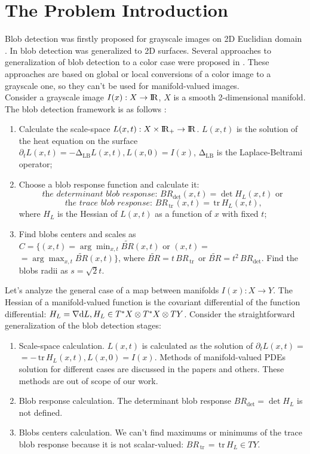 \documentclass{llncs}
\newcommand{\LaplaceBeltrami}{\mathrm{\Delta_{{LB}}}}
\newcommand{\partderiv}[2]{\partial_{#2} {#1}}
\newcommand{\toreal}{\rightarrow\bbbr}
\newcommand{\CovariantDiff}{\nabla}
\newcommand{\Diff}{\mathrm{d}}
\newcommand{\TangentBundle}[1]{T{#1}}
\newcommand{\CotangentBundle}[1]{\tensor*{T}{^{*}}{#1}}
\newcommand {\tr}{{\,}\mathrm{tr}{\,}}
\begin{document}
\section{The Problem Introduction}
Blob detection was firstly proposed for grayscale images on 2D Euclidian domain \cite{blob}. In \cite{ScalarBlob3D} blob detection was generalized to 2D surfaces. Several approaches to generalization of blob detection to a color case were proposed in \cite{ColorBlob,GROM}. These approaches are based on global or local conversions of a color image to a grayscale one, so they can't be used for manifold-valued images.
\\
Consider a grayscale image $I(x):X \toreal$, $X$ is a smooth 2-dimensional manifold. The blob detection framework is as follows \cite{ScalarBlob3D}:
\begin{enumerate} 
\item Calculate the scale-space $L(x,t):X\times \bbbr_{+} \toreal$. $L(x,t)$ is the solution of the heat equation on the surface
  $\partderiv{L(x, t)}{t}=-\LaplaceBeltrami{ L(x, t)},L(x, 0)=I(x)$, $\LaplaceBeltrami$ is the Laplace-Beltrami operator;
\item Choose a blob response function and calculate it: 
\begin{equation} \textit{ the determinant blob response: } BR_{\det}(x, t)=\det{H_L(x,t)}\textrm{  or } \label{blob_det}\end{equation} 
\begin{equation} \textit{ the trace blob response: } BR_{\tr}(x, t)=\tr {H_L(x,t)}, \label{blob_tr}											\end{equation} 
 where $H_L$ is the Hessian of $L(x, t)$ as a function of $x$ with fixed $t$;
\item Find blobs centers and scales as $C=\{(x, t)=\arg \min_{x,t} \tilde{BR}(x, t)\textrm{  or } (x, t)=$
$=\arg \max_{x,t}\tilde{BR}(x, t)\}$, where 
$\tilde{BR}=t\,BR_{\tr}$ or $\tilde{BR}=t^2\,BR_{\det}$. Find the blobs radii as $s=\sqrt{2} t$.
\end{enumerate}

Let's analyze the general case of a map between manifolds $I(x):X \to Y$. The Hessian of a manifold-valued function is the covariant differential of the function differential: $H_L=\CovariantDiff \Diff L,H_L \in \CotangentBundle{X}\otimes\CotangentBundle{X}\otimes\TangentBundle{Y}$. Consider the straightforward generalization of the blob detection stages:
\begin{enumerate}
\item Scale-space calculation. $L(x,t)$ is calculated as the solution of $\partderiv{L(x, t)}{t}=$ $=-\tr H_L(x, t), L(x, 0)=I(x)$. Methods of manifold-valued PDEs solution for different cases are discussed in the papers \cite{Harmonic,Kimmel,DTI} and others. These methods are out of scope of our work.
\item Blob response calculation. The determinant blob response $BR_{\det}=\det H_L$ is not defined. 
\item Blobs centers calculation. We can't find maximums or minimums of the trace blob response because it is not scalar-valued: $BR_{\tr}=\tr{H_L} \in TY$.
\end{enumerate} 
\end{document}
